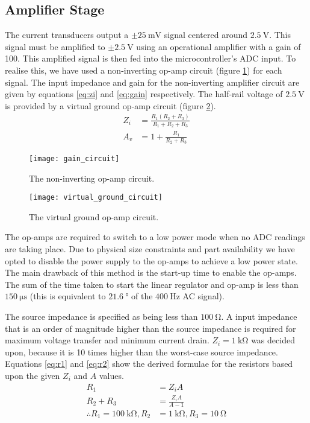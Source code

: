 \subsection{Amplifier Stage}

The current transducers output a $\pm \SI{25}{\milli\volt}$ signal centered around $\SI{2.5}{\volt}$.
This signal must be amplified to $\pm \SI{2.5}{\volt}$ using an operational amplifier with a gain of 100.
This amplified signal is then fed into the microcontroller's ADC input.
To realise this, we have used a non-inverting op-amp circuit (figure \ref{fig:non-inverting-op-amp}) for each signal.
The input impedance and gain for the non-inverting amplifier circuit are given by equations \ref{eq:zi} and \ref{eq:gain} respectively.
The half-rail voltage of $\SI{2.5}{\volt}$ is provided by a virtual ground op-amp circuit (figure \ref{fig:half-supply}).
\begin{align}
	Z_i &= \frac{R_1 (R_2 + R_3)}{R_1 + R_2 + R_3} \label{eq:zi} \\
	A_v &= 1 + \frac{R_1}{R_2 + R_3}\label{eq:gain}
\end{align}

\begin{figure}[H]
	\centering
	\texttt{[image: gain\_circuit]}
	\caption{The non-inverting op-amp circuit.}
	\label{fig:non-inverting-op-amp}
\end{figure}

\begin{figure}[H]
	\centering
	\texttt{[image: virtual\_ground\_circuit]}
	\caption{The virtual ground op-amp circuit.}
	\label{fig:half-supply}
\end{figure}

The op-amps are required to switch to a low power mode when no ADC readings are taking place.
Due to physical size constraints and part availability we have opted to disable the power supply to the op-amps to achieve a low power state.
The main drawback of this method is the start-up time to enable the op-amps.
The sum of the time taken to start the linear regulator and op-amp is less than $\SI{150}{\micro\second}$ (this is equivalent to $\SI{21.6}{\degree}$ of the $\SI{400}{\hertz}$ AC signal).

The source impedance is specified as being less than $\SI{100}{\ohm}$.
A input impedance that is an order of magnitude higher than the source impedance is required for maximum voltage transfer and minimum current drain.
$Z_i = \SI{1}{\kilo\ohm}$ was decided upon, because it is 10 times higher than the worst-case source impedance.
Equations \ref{eq:r1} and \ref{eq:r2} show the derived formulae for the resistors based upon the given $Z_i$ and $A$ values.
\begin{align}
	R_1 &= Z_i A \label{eq:r1} \\
	R_2 + R_3 &= \frac{Z_i A}{A - 1} \label{eq:r2} \\[1em]
	\therefore R_1 = \SI{100}{\kilo\ohm}, R_2 &= \SI{1}{\kilo\ohm}, R_3 = \SI{10}{\ohm} \nonumber
\end{align}


